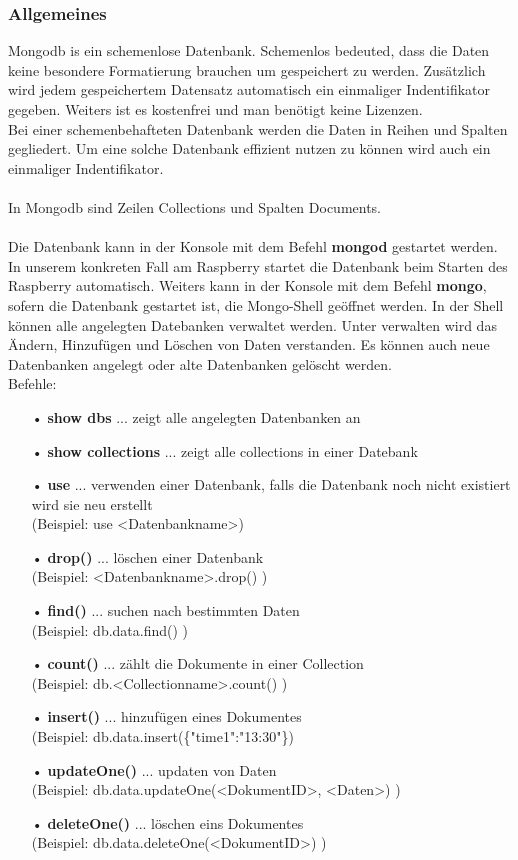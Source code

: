 \subsubsection{Allgemeines}
Mongodb is ein schemenlose Datenbank. Schemenlos bedeuted, dass die Daten keine besondere Formatierung brauchen um gespeichert zu werden. Zusätzlich wird jedem gespeichertem Datensatz automatisch ein einmaliger Indentifikator gegeben. Weiters ist es kostenfrei und man benötigt keine Lizenzen.
\\
Bei einer schemenbehafteten Datenbank werden die Daten in Reihen und Spalten gegliedert. Um eine solche Datenbank effizient nutzen zu können wird auch ein einmaliger Indentifikator.
\\ \\ 
In Mongodb sind Zeilen Collections und Spalten Documents. 
\\ \\
Die Datenbank kann in der Konsole mit dem Befehl \textbf{mongod} gestartet werden. In unserem konkreten Fall am Raspberry startet die Datenbank beim Starten des Raspberry automatisch. Weiters kann in der Konsole mit dem Befehl \textbf{mongo}, sofern die Datenbank gestartet ist, die Mongo-Shell geöffnet werden. In der Shell können alle angelegten Datebanken verwaltet werden. Unter verwalten wird das Ändern, Hinzufügen und Löschen von Daten verstanden. Es können auch neue Datenbanken angelegt oder alte Datenbanken gelöscht werden. 
\\ Befehle:
\begin{itemize}
\item[•] \textbf{show dbs} ... zeigt alle angelegten Datenbanken an
\item[•] \textbf{show collections} ... zeigt alle collections in einer Datebank
\item[•] \textbf{use} ... verwenden einer Datenbank, falls die Datenbank noch nicht existiert wird sie neu erstellt 
\\     (Beispiel: use <Datenbankname>)
\item[•] \textbf{drop()} ... löschen einer Datenbank
\\     (Beispiel: <Datenbankname>.drop() )
\item[•] \textbf{find()} ... suchen nach bestimmten Daten 
\\     (Beispiel: db.data.find() )
\item[•] \textbf{count()} ... zählt die Dokumente in einer Collection
\\     (Beispiel: db.<Collectionname>.count() )
\item[•] \textbf{insert()} ... hinzufügen eines Dokumentes
\\     (Beispiel: db.data.insert(\{"time1":"13:30"\})
\item[•] \textbf{updateOne()} ... updaten von Daten
\\     (Beispiel: db.data.updateOne(<DokumentID>, <Daten>) )
\item[•] \textbf{deleteOne()} ... löschen eins Dokumentes
\\     (Beispiel: db.data.deleteOne(<DokumentID>) )

\end{itemize}

